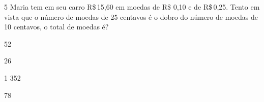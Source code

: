 








\pagebreak

\num{5} Maria tem em seu carro R\$\,15,60 em moedas de R\$ 0,10 e de R\$\,0,25.
Tento em vista que o número de moedas de 25 centavos é o dobro do número
de moedas de 10 centavos, o total de moedas é?

\begin{escolha}
\item 52
\item 26
\item 1 352
\item 78
\end{escolha}













